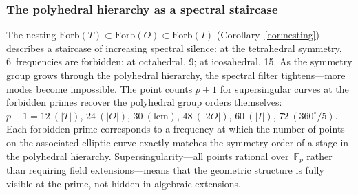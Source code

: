 \documentclass[11pt,letterpaper]{article}
\theoremstyle{definition}
\newcommand{\Forb}{\mathrm{Forb}}
\newcommand{\FF}{\mathbb{F}}
\newcommand{\abs}[1]{\lvert #1 \rvert}
\begin{document}
\subsubsection*{The polyhedral hierarchy as a spectral staircase}
The nesting $\Forb(T)\subset\Forb(O)\subset\Forb(I)$ (Corollary~\ref{cor:nesting}) describes a staircase of increasing spectral silence: at the tetrahedral symmetry, 6~frequencies are forbidden; at octahedral, 9; at icosahedral, 15.  As the symmetry group grows through the polyhedral hierarchy, the spectral filter tightens---more modes become impossible.
The point counts $p+1$ for supersingular curves at the forbidden primes recover the polyhedral group orders themselves: $p+1 = 12\ (\abs{T})$, $24\ (\abs{O})$, $30\ (\mathrm{lcm})$, $48\ (\abs{2O})$, $60\ (\abs{I})$, $72\ (360^\circ/5)$.  Each forbidden prime corresponds to a frequency at which the number of points on the associated elliptic curve exactly matches the symmetry order of a stage in the polyhedral hierarchy.  Supersingularity---all points rational over~$\FF_p$ rather than requiring field extensions---means that the geometric structure is fully visible at the prime, not hidden in algebraic extensions.
\end{document}
